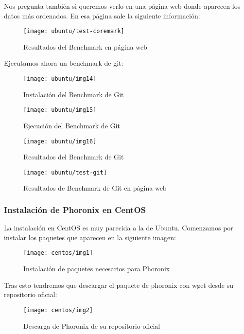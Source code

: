 Nos pregunta también si queremos verlo en una página web donde aparecen los datos más ordenados. En esa página sale la siguiente información:

\begin{figure}[H]
    \centering
    \texttt{[image: ubuntu/test-coremark]}
    \caption{Resultados del Benchmark en página web}
\end{figure}

\newpage
Ejecutamos ahora un benchmark de git:

\begin{figure}[H]
    \centering
    \texttt{[image: ubuntu/img14]}
    \caption{Instalación del Benchmark de Git}
\end{figure}

\begin{figure}[H]
    \centering
    \texttt{[image: ubuntu/img15]}
    \caption{Ejecución del Benchmark de Git}
\end{figure}

\begin{figure}[H]
    \centering
    \texttt{[image: ubuntu/img16]}
    \caption{Resultados del Benchmark de Git}
\end{figure}

\begin{figure}[H]
    \centering
    \texttt{[image: ubuntu/test-git]}
    \caption{Resultados de Benchmark de Git en página web}
\end{figure}

\newpage
\subsubsection{Instalación de Phoronix en CentOS}

La instalación en CentOS es muy parecida a la de Ubuntu. Comenzamos por instalar los paquetes que aparecen en la siguiente imagen:

\begin{figure}[H]
    \centering
    \texttt{[image: centos/img1]}
    \caption{Instalación de paquetes necesarios para Phoronix}
\end{figure}

Tras esto tendremos que descargar el paquete de phoronix con wget desde su repositorio oficial:

\begin{figure}[H]
    \centering
    \texttt{[image: centos/img2]}
    \caption{Descarga de Phoronix de su repositorio oficial}
\end{figure}

